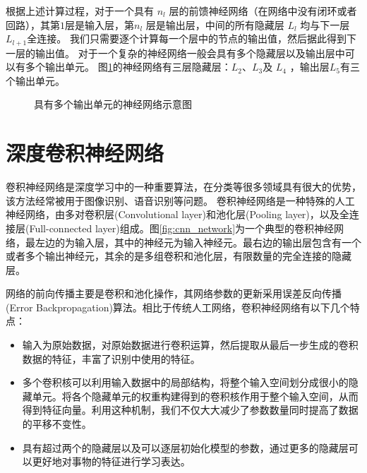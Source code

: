 





根据上述计算过程，对于一个具有 $n_l$ 层的前馈神经网络（在网络中没有闭环或者回路），其第$   1 $层是输入层，第$n_l$ 层是输出层，中间的所有隐藏层 $L_l$ 均与下一层 $L_{l+1}$全连接。
我们只需要逐个计算每一个层中的节点的输出值，然后据此得到下一层的输出值。
对于一个复杂的神经网络一般会具有多个隐藏层以及输出层中可以有多个输出单元。
图\ref{fig:network2}的神经网络有三层隐藏层：$  L_2 $、$ L_3$及 $ L_4$ ，输出层$  L_5 $有三个输出单元。

\begin{figure}
  \centering
  
  \caption{具有多个输出单元的神经网络示意图}
  \label{fig:network2}
\end{figure}

\section{深度卷积神经网络}

卷积神经网络是深度学习中的一种重要算法，在分类等很多领域具有很大的优势，该方法经常被用于图像识别、语音识别等问题。
卷积神经网络是一种特殊的人工神经网络，由多对卷积层(Convolutional layer)和池化层(Pooling layer)，以及全连接层(Full-connected layer)组成。图\ref{fig:cnn_network}为一个典型的卷积神经网络，最左边的为输入层，其中的神经元为输入神经元。最右边的输出层包含有一个或者多个输出神经元，其余的是多组卷积和池化层，有限数量的完全连接的隐藏层。

网络的前向传播主要是卷积和池化操作，其网络参数的更新采用误差反向传播(Error Backpropagation)算法。相比于传统人工网络，卷积神经网络有以下几个特点：
\begin{itemize}
  \item 输入为原始数据，对原始数据进行卷积运算，然后提取从最后一步生成的卷积数据的特征，丰富了识别中使用的特征。
  \item 多个卷积核可以利用输入数据中的局部结构，将整个输入空间划分成很小的隐藏单元。将各个隐藏单元的权重构建得到的卷积核作用于整个输入空间，从而得到特征向量。利用这种机制，我们不仅大大减少了参数数量同时提高了数据的平移不变性。
  \item 具有超过两个的隐藏层以及可以逐层初始化模型的参数，通过更多的隐藏层可以更好地对事物的特征进行学习表达。
\end{itemize}


